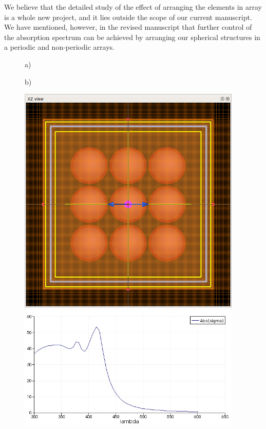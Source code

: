 \documentclass[a4paper]{article}
\begin{document}
We believe that the detailed study of the effect of arranging the
elements in array is a whole new project, and it lies outside the
scope of our current manuscript. We have mentioned, however, in the
revised manuscript that further control of the absorption spectrum can
be achieved by arranging our spherical structures in a periodic and
non-periodic arrays.

\begin{figure}
  \begin{minipage}[h]{0.49\textwidth}    \begin{flushleft}     a)    \end{flushleft}
  \end{minipage}
  \begin{minipage}[h]{0.49\textwidth}    \begin{flushleft}     b)    \end{flushleft}
  \end{minipage}
  \begin{minipage}[h]{0.49\textwidth} 
   \includegraphics[width=0.95\textwidth]{fdtd-3x3}
  \end{minipage}
  \begin{minipage}[h]{0.49\textwidth} 
   \includegraphics[width=0.95\textwidth]{fdtd-spectra-3x3}

\end{minipage}
\end{figure}
\end{document}
